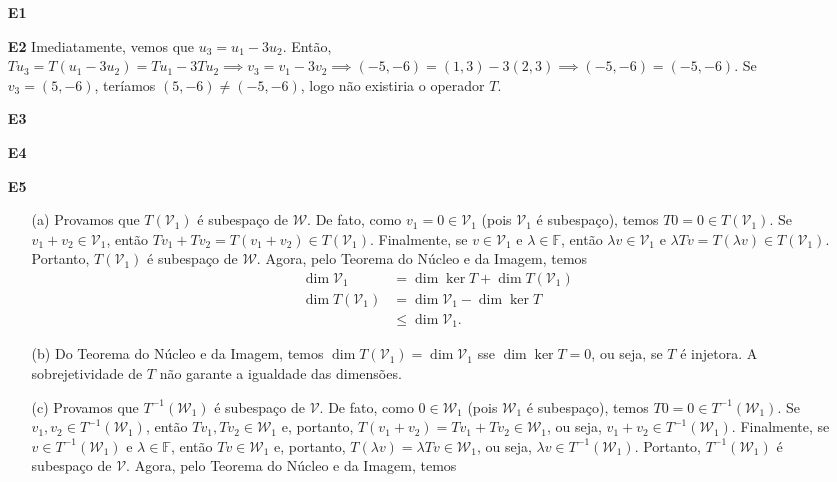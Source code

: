 \documentclass{article}
\begin{document}
\begin{enumerate}
    \item[\textbf{E1}] 
    
    \item[\textbf{E2}] Imediatamente, vemos que \(u_3 = u_1 - 3 u_2\). Então, \(Tu_3 = T(u_1 - 3 u_2) = Tu_1 - 3Tu_2 \implies v_3 = v_1 - 3v_2 \implies (-5,-6) = (1,3) - 3(2,3) \implies (-5,-6) = (-5,-6)\). Se \(v_3 = (5,-6)\), teríamos \((5,-6)\neq(-5,-6)\), logo não existiria o operador \(T\).

    \item[\textbf{E3}] 
    \item[\textbf{E4}]
    \item[\textbf{E5}] 
        \begin{enumerate}
            \item[(a)] Provamos que \(T(\mathcal{V}_1)\) é subespaço de \(\mathcal{W}\). De fato, como \(v_1=0 \in \mathcal{V}_1\) (pois \(\mathcal{V}_1\) é subespaço), temos \(T0 = 0 \in T(\mathcal{V}_1)\). Se \(v_1+v_2 \in \mathcal{V}_1\), então \(Tv_1 + Tv_2 = T(v_1+v_2) \in T(\mathcal{V}_1)\). Finalmente, se \(v \in \mathcal{V}_1\) e \(\lambda \in \mathbb{F}\), então \(\lambda v \in \mathcal{V}_1\) e \(\lambda Tv = T(\lambda v) \in T(\mathcal{V}_1)\). Portanto, \(T(\mathcal{V}_1)\) é subespaço de \(\mathcal{W}\). Agora, pelo Teorema do Núcleo e da Imagem, temos
                \begin{align}
                    \dim \mathcal{V}_1 &= \dim \ker T + \dim T(\mathcal{V}_1) \\
                    \dim T(\mathcal{V}_1) &= \dim \mathcal{V}_1 - \dim \ker T \\
                    &\leq \dim \mathcal{V}_1.
                \end{align}
            \item[(b)] Do Teorema do Núcleo e da Imagem, temos \(\dim T(\mathcal{V}_1) = \dim \mathcal{V}_1\) sse \(\dim \ker T = 0\), ou seja, se \(T\) é injetora. A sobrejetividade de \(T\) não garante a igualdade das dimensões.
            \item[(c)] Provamos que \(T^{-1}(\mathcal{W}_1)\) é subespaço de \(\mathcal{V}\). De fato, como \(0 \in \mathcal{W}_1\) (pois \(\mathcal{W}_1\) é subespaço), temos \(T0 = 0 \in T^{-1}(\mathcal{W}_1)\). Se \(v_1, v_2 \in T^{-1}(\mathcal{W}_1)\), então \(Tv_1, Tv_2 \in \mathcal{W}_1\) e, portanto, \(T(v_1+v_2) = Tv_1 + Tv_2 \in \mathcal{W}_1\), ou seja, \(v_1 + v_2 \in T^{-1}(\mathcal{W}_1)\). Finalmente, se \(v \in T^{-1}(\mathcal{W}_1)\) e \(\lambda \in \mathbb{F}\), então \(Tv \in \mathcal{W}_1\) e, portanto, \(T(\lambda v) = \lambda Tv \in \mathcal{W}_1\), ou seja, \(\lambda v \in T^{-1}(\mathcal{W}_1)\). Portanto, \(T^{-1}(\mathcal{W}_1)\) é subespaço de \(\mathcal{V}\). Agora, pelo Teorema do Núcleo e da Imagem, temos
                

\end{enumerate}
\end{enumerate}
\end{document}
